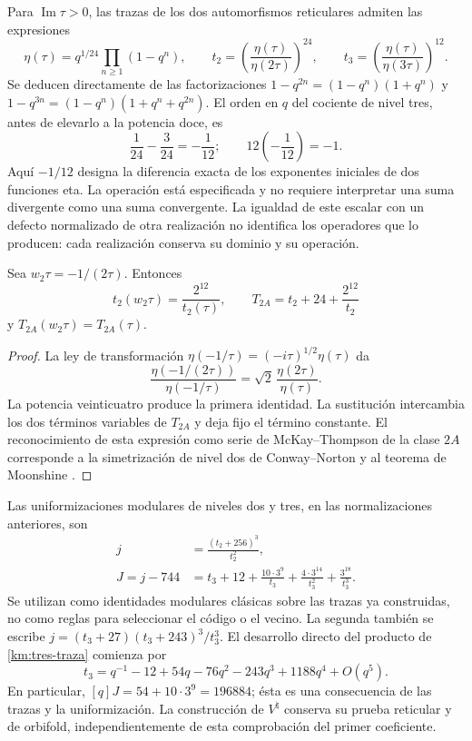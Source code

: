 Para \(\operatorname{Im}\tau>0\), las trazas de los dos automorfismos
reticulares admiten las expresiones
\begin{equation}
 \eta(\tau)=q^{1/24}\prod_{n\ge1}(1-q^n),\qquad
 t_2=\left(\frac{\eta(\tau)}{\eta(2\tau)}\right)^{24},\qquad
 t_3=\left(\frac{\eta(\tau)}{\eta(3\tau)}\right)^{12}.
 \label{km:eta-trazas}
\end{equation}
Se deducen directamente de las factorizaciones
\(1-q^{2n}=(1-q^n)(1+q^n)\) y
\(1-q^{3n}=(1-q^n)(1+q^n+q^{2n})\). El orden en \(q\) del
cociente de nivel tres, antes de elevarlo a la potencia doce, es
\[
 \frac1{24}-\frac3{24}=-\frac1{12};
 \qquad 12\left(-\frac1{12}\right)=-1.
\]
Aquí \(-1/12\) designa la diferencia exacta de los exponentes
iniciales de dos funciones eta. La operación está especificada y no
requiere interpretar una suma divergente como una suma convergente.
La igualdad de este escalar con un defecto normalizado de otra
realización no identifica los operadores que lo producen: cada
realización conserva su dominio y su operación.

\begin{proposition}
\label{km:fricke-prop}
Sea \(w_2\tau=-1/(2\tau)\). Entonces
\begin{equation}
 t_2(w_2\tau)=\frac{2^{12}}{t_2(\tau)},\qquad
 T_{2A}=t_2+24+\frac{2^{12}}{t_2}
 \label{km:fricke-t2}
\end{equation}
y \(T_{2A}(w_2\tau)=T_{2A}(\tau)\).
\end{proposition}
\begin{proof}
La ley de transformación
\(\eta(-1/\tau)=(-i\tau)^{1/2}\eta(\tau)\) da
\[
 \frac{\eta(-1/(2\tau))}{\eta(-1/\tau)}
 =\sqrt2\,\frac{\eta(2\tau)}{\eta(\tau)}.
\]
La potencia veinticuatro produce la primera identidad. La sustitución
intercambia los dos términos variables de \(T_{2A}\) y deja fijo
el término constante. El reconocimiento de esta expresión como serie
de McKay--Thompson de la clase \(2A\) corresponde a la
simetrización de nivel dos de Conway--Norton
\cite[\S\S4 y 6, tabla~3]{kmconwaynorton1979} y al teorema
de Moonshine \cite{borcherds}.
\end{proof}

Las uniformizaciones modulares de niveles dos y tres, en las
normalizaciones anteriores, son
\begin{align}
 j&=\frac{(t_2+256)^3}{t_2^2},
 \label{km:j-nivel2}\\
 J=j-744
 &=t_3+12+\frac{10\cdot3^9}{t_3}
       +\frac{4\cdot3^{14}}{t_3^2}
       +\frac{3^{18}}{t_3^3}.
 \label{km:j-nivel3}
\end{align}
Se utilizan como identidades modulares clásicas sobre las trazas ya
construidas, no como reglas para seleccionar el código o el vecino.
La segunda también se escribe
\(j=(t_3+27)(t_3+243)^3/t_3^3\).
El desarrollo directo del producto de \eqref{km:tres-traza} comienza por
\[
 t_3=q^{-1}-12+54q-76q^2-243q^3+1188q^4+O(q^5).
\]
En particular, \([q]J=54+10\cdot3^9=196884\); ésta es una
consecuencia de las trazas y la uniformización. La construcción de
\(V^\natural\) conserva su prueba reticular y de orbifold,
independientemente de esta comprobación del primer coeficiente.

